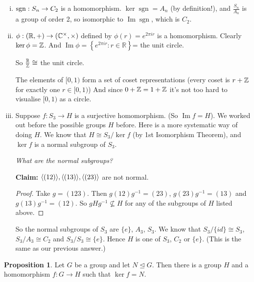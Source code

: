 \documentclass{article}
\theoremstyle{definition} \newtheorem*{definition}{Definition}
\newtheorem{proposition}[theorem]{Proposition}
\newcommand{\reals}{\mathbb{R}} \newcommand{\rationals}{\mathbb{Q}}
\newcommand{\ism}{\cong} \newcommand{\elemt}[2]{#1_{{#2}\sigma(#2)}}
\DeclareMathOperator{\sgn}{sgn} \DeclareMathOperator{\id}{id}
\DeclareMathOperator{\Ima}{Im} \DeclareMathOperator{\Sym}{Sym}
\begin{document}
\begin{exmps}\hfill \begin{enumerate}[(i)] \item $\func{\sgn}{S_n}{C_2}$ is a
        homomorphism.  $\ker \sgn = A_n$ (by definition!), and
      $\frac{S_n}{A_n}$ is a group of order 2, so isomorphic to $\Ima \sgn$,
    which is $C_2$.  \item
      $\func{\phi}{(\reals,+)}{(\complexes^\times,\times)}$ defined by
      $\phi(r)=e^{2\pi i r}$ is a homomorphism.  Clearly $\ker \phi =
      \mathbb{Z}$.  And $\Ima \phi = \left\{ e^{2\pi i r} : r \in \reals
    \right\}$= the unit circle.

      So $\frac{\reals}{\integers}\ism$ the unit circle.


      The elements of $[0,1)$ form a set of coset representations (every coset
        is $r+\mathbb{Z}$ for exactly one $r \in [0,1)$) And since $0+\mathbb{Z}
          = 1+\mathbb{Z}$ it's not too hard to visualise $[0,1)$ as a circle.

      \item Suppose $f:S_3 \rightarrow H$ is a surjective homomorphism. (So
        $\Ima f = H$). We worked out before the possible groups $H$ before.
        Here is a more systematic way of doing $H$. We know that $H \ism
        S_3/\ker f$ (by 1st Isomorphism Theorem), and $\ker f$ is a normal
        subgroup of $S_3$.

        \emph{What are the normal subgroups?}

        \textbf{Claim:} $\langle (12) \rangle,\langle (13) \rangle, \langle (23) \rangle$ are not normal.

        \begin{proof} Take $g=(123)$. Then $g(12)g^{-1}=(23)$,
          $g(23)g^{-1}=(13)$ and $g(13)g^{-1}=(12)$. So $gHg^{-1} \not\subseteq
          H$ for any of the subgroups of $H$ listed above.  \end{proof} So the
        normal subgroups of $S_3$ are $\{e\}$, $A_3$, $S_3$. We know that
        $S_3/\{id\} \ism S_3$, $S_3/A_3 \ism C_2$ and $S_3/S_3 \ism \{e\}$.
        Hence $H$ is one of $S_3$, $C_2$ or $\{e\}$. (This is the same as our
        previous answer.)\\ \end{enumerate} \end{exmps}

  \begin{proposition} Let $G$ be a group and let $N \trianglelefteq G$. Then
    there is a group $H$ and a homomorphism $f : G \rightarrow H$ such that
    $\ker f = N$.  \end{proposition}
\end{document}
